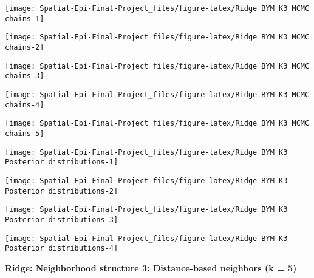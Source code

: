 \documentclass[]{article}
\begin{document}
\begin{center}\texttt{[image: Spatial-Epi-Final-Project\_files/figure-latex/Ridge BYM K3 MCMC chains-1]} \end{center}

\begin{center}\texttt{[image: Spatial-Epi-Final-Project\_files/figure-latex/Ridge BYM K3 MCMC chains-2]} \end{center}

\begin{center}\texttt{[image: Spatial-Epi-Final-Project\_files/figure-latex/Ridge BYM K3 MCMC chains-3]} \end{center}

\begin{center}\texttt{[image: Spatial-Epi-Final-Project\_files/figure-latex/Ridge BYM K3 MCMC chains-4]} \end{center}

\begin{center}\texttt{[image: Spatial-Epi-Final-Project\_files/figure-latex/Ridge BYM K3 MCMC chains-5]} \end{center}

\begin{center}\texttt{[image: Spatial-Epi-Final-Project\_files/figure-latex/Ridge BYM K3 Posterior distributions-1]} \end{center}

\begin{center}\texttt{[image: Spatial-Epi-Final-Project\_files/figure-latex/Ridge BYM K3 Posterior distributions-2]} \end{center}

\begin{center}\texttt{[image: Spatial-Epi-Final-Project\_files/figure-latex/Ridge BYM K3 Posterior distributions-3]} \end{center}

\begin{center}\texttt{[image: Spatial-Epi-Final-Project\_files/figure-latex/Ridge BYM K3 Posterior distributions-4]} \end{center}

\textbf{Ridge: Neighborhood structure 3: Distance-based neighbors (k =
5)}
\end{document}
